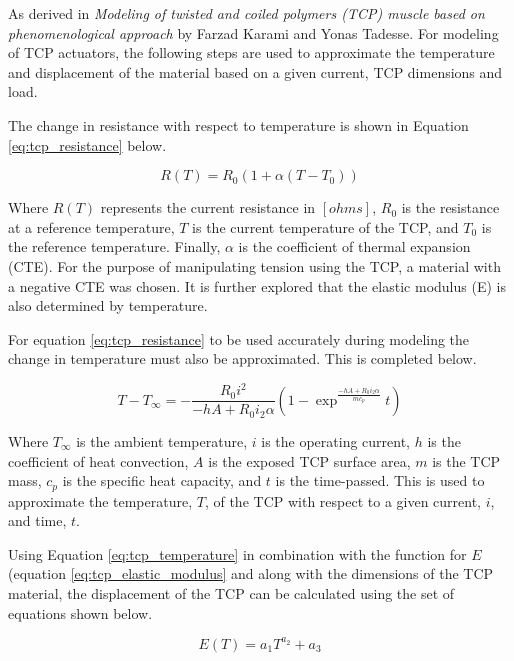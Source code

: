\label{sect:modeling_techniques}
	
	As derived in \textit{Modeling of twisted and coiled polymers (TCP) muscle based on phenomenological approach} by Farzad Karami and Yonas Tadesse. For modeling of TCP actuators, the following steps are used to approximate the temperature and displacement of the material based on a given current, TCP dimensions and load.

	The change in resistance with respect to temperature is shown in Equation \ref{eq:tcp_resistance} below.
	
	\begin{equation}
	\label{eq:tcp_resistance}
		R(T) = R_{0} (1 + \alpha (T - T_{0}))
	\end{equation}
	
	Where $R(T)$ represents the current resistance in $[ohms]$, $R_{0}$ is the resistance at a reference temperature, $T$ is the current temperature of the TCP, and $T_{0}$ is the reference temperature. Finally, $\alpha$ is the coefficient of thermal expansion (CTE). For the purpose of manipulating tension using the TCP, a material with a negative CTE was chosen. It is further explored that the elastic modulus (E) is also determined by temperature.
	
	For equation \ref{eq:tcp_resistance} to be used accurately during modeling the change in temperature must also be approximated. This is completed below.
	
	\begin{equation}
	\label{eq:tcp_temperature}
		T - T_{\infty} =
			- \frac{R_{0} i^{2}}{-h A + R_{0} i_{2} \alpha}
			\left(
				1 -
				\exp^{\frac{-h A + R_{0} i_{2} \alpha}{m c_{p}}} t
			\right)
	\end{equation}
	
	Where $T_{\infty}$ is the ambient temperature, $i$ is the operating current, $h$ is the coefficient of heat convection, $A$ is the exposed TCP surface area, $m$ is the TCP mass, $c_{p}$ is the specific heat capacity, and $t$ is the time-passed. This is used to approximate the temperature, $T$, of the TCP with respect to a given current, $i$, and time, $t$.
	
	Using Equation \ref{eq:tcp_temperature} in combination with the function for $E$ (equation \ref{eq:tcp_elastic_modulus} and along with the dimensions of the TCP material, the displacement of the TCP can be calculated using the set of equations shown below.
	
	\begin{equation}
	\label{eq:tcp_elastic_modulus}
		E(T) = a_{1} T^{a_{2}} + a_{3}
	\end{equation}
	
